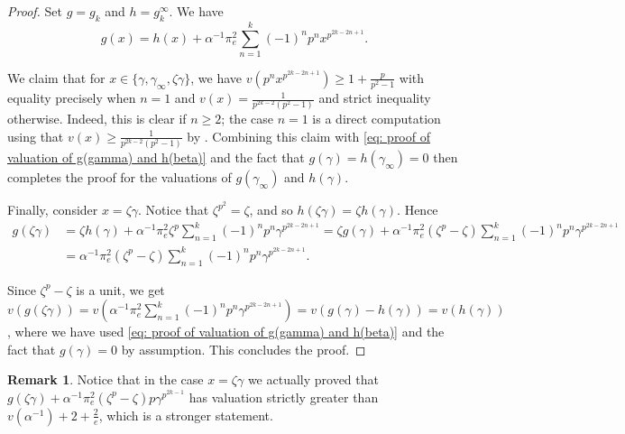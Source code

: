 \documentclass{amsart}
\theoremstyle{definition}
\newtheorem{remark}[theorem]{Remark}
\numberwithin{theorem}{section}
\numberwithin{equation}{section}
\begin{document}
\begin{proof}
    Set $g=g_k$ and $h=g_k^\infty$. We have
    \begin{equation}\label{eq: proof of valuation of g(gamma) and h(beta)}
        g(x) = h(x) + \alpha^{-1}\pi_e^2\sum_{n=1}^k (-1)^n p^n x^{p^{2k-2n+1}}.
    \end{equation}
    
    We claim that for $x \in \{\gamma, \gamma_\infty, \zeta\gamma\}$, we have $v(p^n x^{p^{2k-2n+1}}) \geq 1 + \frac{p}{p^2-1}$ with equality precisely when $n=1$ and $v(x)= \frac{1}{p^{2k-2}(p^2-1)}$ and strict inequality otherwise. Indeed, this is clear if $n \geq 2$; the case $n=1$ is a direct computation using that $v(x)\geq \frac{1}{p^{2k-2}(p^2-1)}$ by . Combining this claim with \eqref{eq: proof of valuation of g(gamma) and h(beta)} and the fact that $g(\gamma)=h(\gamma_{\infty})=0$ then completes the proof for the valuations of $g(\gamma_{\infty})$ and $h(\gamma)$.

    Finally, consider $x=\zeta\gamma$. Notice that $\zeta^{p^2} = \zeta$, and so $h(\zeta\gamma) = \zeta h(\gamma)$. Hence
    \begin{align*}
        g(\zeta\gamma) &= \zeta h(\gamma) + \alpha^{-1}\pi_e^2 \zeta^p \sum_{n=1}^k (-1)^n p^n \gamma^{p^{2k-2n+1}} = \zeta g(\gamma) + \alpha^{-1}\pi_e^2 (\zeta^p-\zeta) \sum_{n=1}^k (-1)^n p^n \gamma^{p^{2k-2n+1}} \\
        &= \alpha^{-1}\pi_e^2 (\zeta^p-\zeta) \sum_{n=1}^k (-1)^n p^n \gamma^{p^{2k-2n+1}}.
    \end{align*}
    
    Since $\zeta^p-\zeta$ is a unit, we get $v(g(\zeta\gamma)) = v\left(\alpha^{-1}\pi_e^2 \sum_{n=1}^k (-1)^n p^n \gamma^{p^{2k-2n+1}}\right)=v(g(\gamma)-h(\gamma))=v(h(\gamma))$, where we have used \eqref{eq: proof of valuation of g(gamma) and h(beta)} and the fact that $g(\gamma)=0$ by assumption. This concludes the proof.

\end{proof}

\begin{remark}\label{rmk: g zetabeta congruence}
    Notice that in the case $x=\zeta\gamma$ we actually proved that $g(\zeta\gamma) + \alpha^{-1}\pi_e^2 (\zeta^p-\zeta) p\gamma^{p^{2k-1}}$ has valuation strictly greater than $v(\alpha^{-1}) + 2 + \frac{2}{e}$, which is a stronger statement.
\end{remark}
\end{document}

